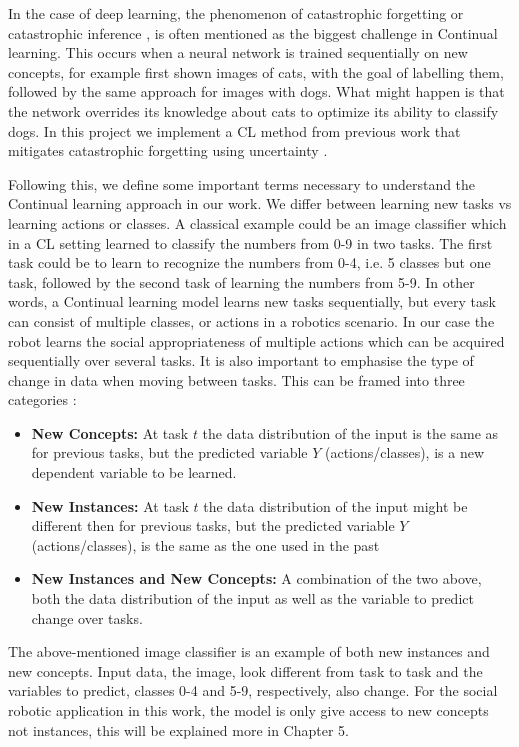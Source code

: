 \documentclass[a4paper,12pt]{report}
\begin{document}
In the case of deep learning, the phenomenon of catastrophic forgetting \cite{french1999catastrophic} or catastrophic inference \cite{mccloskey1989catastrophic}, is often mentioned as the biggest challenge in Continual learning. This occurs when a neural network is trained sequentially on new concepts, for example first shown images of cats, with the goal of labelling them, followed by the same approach for images with dogs. What might happen is that the network overrides its knowledge about cats to optimize its ability to classify dogs. In this project we implement a CL method from previous work that mitigates catastrophic forgetting using uncertainty \cite{ebrahimi2019uncertainty}. 

Following this, we define some important terms necessary to understand the Continual learning approach in our work. We differ between learning new tasks vs learning actions or classes. A classical example could be an image classifier which in a CL setting learned to classify the numbers from 0-9 in two tasks. The first task could be to learn to recognize the numbers from 0-4, i.e. 5 classes but one task, followed by the second task of learning the numbers from 5-9. In other words, a Continual learning model learns new tasks sequentially, but every task can consist of multiple classes, or actions in a robotics scenario. In our case the robot learns the social appropriateness of multiple actions which can be acquired sequentially over several tasks. It is also important to emphasise the type of change in data when moving between tasks. This can be framed into three categories \cite{lesort2020continual}:
\newpage
\begin{itemize}
  \item \textbf{New Concepts:} At task $t$ the data distribution of the input is the same as for previous tasks, but the predicted variable $Y$ (actions/classes), is a new dependent variable to be learned.
  \item \textbf{New Instances:} At task $t$ the data distribution of the input might be different then for previous tasks, but the predicted variable $Y$ (actions/classes), is the same as the one used in the past
  \item \textbf{New Instances and New Concepts:} A combination of the two above, both the data distribution of the input as well as the variable to predict change over tasks.
\end{itemize}

The above-mentioned image classifier is an example of both new instances and new concepts. Input data, the image, look different from task to task and the variables to predict, classes 0-4 and 5-9, respectively, also change. For the social robotic application in this work, the model is only give access to new concepts not instances, this will be explained more in Chapter 5.
\end{document}

